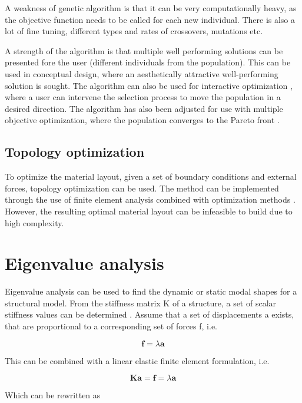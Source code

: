 A weakness of genetic algorithm is that it can be very computationally heavy, as the objective function needs to be called for each new individual. There is also a lot of fine tuning, different types and rates of crossovers, mutations etc. 

A strength of the algorithm is that multiple well performing solutions can be presented fore the user (different individuals from the population). This can be used in conceptual design, where an aesthetically attractive well-performing solution is sought. The algorithm can also be used for interactive optimization \cite{Scott2002}, where a user can intervene the selection process to move the population in a desired direction. The algorithm has also been adjusted for use with multiple objective optimization, where the population converges to the Pareto front \cite{deb2002fast}.

\subsection{Topology optimization}
To optimize the material layout, given a set of boundary conditions and external forces, topology optimization can be used. The method can be implemented through the use of finite element analysis combined with optimization methods \cite{bendsoe2009topology}. However, the resulting optimal material layout can be infeasible to build due to high complexity.

\section{Eigenvalue analysis}
Eigenvalue analysis can be used to find the dynamic or static modal shapes for a structural model. From the stiffness matrix K of a structure, a set of scalar stiffness values can be determined \cite{Olsson2003}. Assume that a set of displacements a exists, that are proportional to a corresponding set of forces f, i.e.

\begin{equation*}
\mathbf{f} = \lambda \mathbf{a}
\end{equation*}

This can be combined with a linear elastic finite element formulation, i.e.

\begin{equation*}
\mathbf{Ka} =\mathbf{f} = \lambda \mathbf{a}
\end{equation*}

Which can be rewritten as


